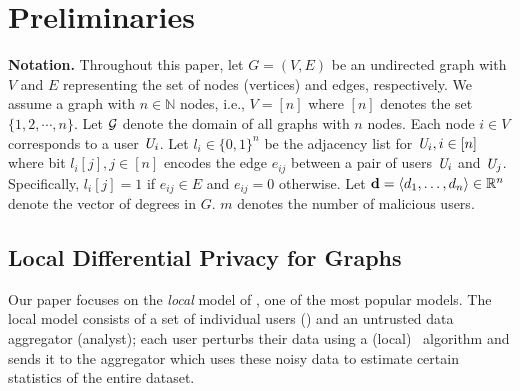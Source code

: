 \section{Preliminaries}\label{chap4-sec:background}
\textbf{Notation.}
Throughout this paper, let $G = (V, E)$ be an undirected 
graph with $V$ and $E$ representing the set of nodes (vertices) and edges, respectively. We assume a graph with $n \in \mathbb{N}$ nodes, i.e., $V = [n]$ where $[n]$ denotes the set $\{1,2,\cdots,n\}$. Let $\mathcal{G}$ denote the domain of all graphs with $n$ nodes. Each node $i \in V$ corresponds to a user $\textit{U}_i$. Let $l_i \in \{0,1\}^n$ be the adjacency list for $\textit{U}_i, i \in [n]$ where bit $l_i[j], j \in [n]$ encodes the edge $e_{ij}$ between a pair of users $\textit{U}_i$ and $\textit{U}_j$. Specifically, $l_i[j]=1$ if $e_{ij}\in E$ and $e_{ij}=0$ otherwise. %
Let $\textbf{d}=\langle d_1, \ldots, d_n\rangle \in \mathbb{R}^n$ denote the vector of degrees in $G$. $m$ denotes the number of malicious users.


\subsection{Local Differential Privacy for Graphs}\label{chap4-sec:ldp}
Our paper focuses on the \textit{local} model of \DP, one of the most popular models. %
The local model consists of a set of individual users (\DO) and an untrusted data aggregator (analyst); each user perturbs their data using a (local) \DP~algorithm and sends it to the aggregator which uses these noisy data to estimate certain statistics of the entire dataset. %
 
